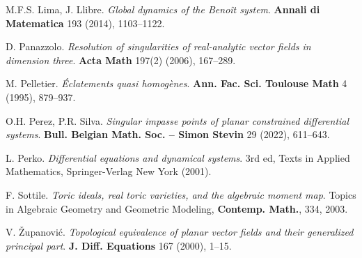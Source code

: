 \documentclass[12pt]{amsart}
\begin{document}
\begin{thebibliography}{99}
 M.F.S. Lima, J. Llibre. \emph{Global dynamics of the Benoît system}. \textbf{Annali di Matematica} 193 (2014), 1103--1122.

 D. Panazzolo. \emph{Resolution of singularities of real-analytic vector fields in dimension three}. \textbf{Acta Math} 197(2) (2006), 167--289.

 M. Pelletier. \emph{\'Eclatements quasi homog\`enes}. \textbf{Ann. Fac. Sci. Toulouse Math} 4 (1995), 879--937.

 O.H. Perez, P.R. Silva. \emph{Singular impasse points of planar constrained differential systems}. \textbf{Bull. Belgian Math. Soc. -- Simon Stevin} 29 (2022), 611--643.

 L. Perko. \emph{Differential equations and dynamical systems}. 3rd ed, Texts in Applied Mathematics, Springer-Verlag New York (2001).

 F. Sottile. \emph{Toric ideals, real toric varieties, and the algebraic moment map}. Topics in Algebraic Geometry and Geometric Modeling, \textbf{Contemp. Math.}, 334, 2003.

 V. Županović. \emph{Topological equivalence of planar vector fields and their generalized principal part}. \textbf{J. Diff. Equations} 167 (2000), 1--15.

\end{thebibliography}
\end{document}
